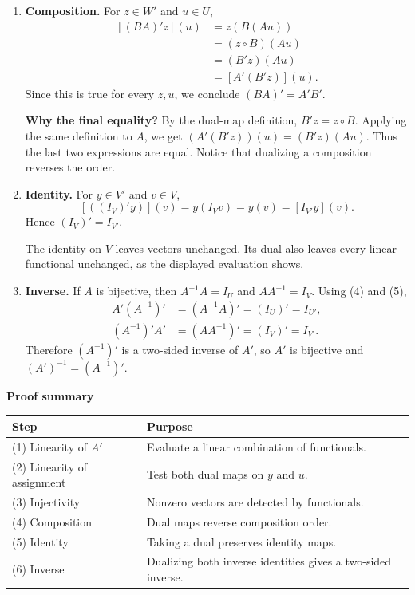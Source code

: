 \documentclass[11pt,a4paper]{article}
\newenvironment{proofsteps}{\begin{enumerate}\setlength{\itemsep}{4pt}}{\end{enumerate}}
\newcommand{\prooftable}[1]{\medskip\textbf{Proof summary}\par\smallskip #1\medskip}
\begin{document}
\begin{proofsteps}
\item \textbf{Composition.} For \(z\in W'\) and \(u\in U\),
\[
 \begin{aligned}
 [(BA)'z](u)
 &=z(B(Au))\\
 &=(z\circ B)(Au)\\
 &=(B'z)(Au)\\
 &=[A'(B'z)](u).
 \end{aligned}
\]
Since this is true for every \(z,u\), we conclude \((BA)'=A'B'\).
\begin{personalnote}
\textbf{Why the final equality?} By the dual-map definition, \(B'z=z\circ B\). Applying the same definition to \(A\), we get
\((A'(B'z))(u)=(B'z)(Au)\). Thus the last two expressions are equal. Notice that dualizing a composition reverses the order.
\end{personalnote}

\item \textbf{Identity.} For \(y\in V'\) and \(v\in V\),
\[
 [((I_V)'y)](v)=y(I_Vv)=y(v)=[I_{V'}y](v).
\]
Hence \((I_V)'=I_{V'}\).
\begin{personalnote}
The identity on \(V\) leaves vectors unchanged. Its dual also leaves every linear functional unchanged, as the displayed evaluation shows.
\end{personalnote}

\item \textbf{Inverse.} If \(A\) is bijective, then \(A^{-1}A=I_U\) and \(AA^{-1}=I_V\). Using (4) and (5),
\[
 \begin{aligned}
 A'(A^{-1})'&=(A^{-1}A)'=(I_U)'=I_{U'},\\
 (A^{-1})'A'&=(AA^{-1})'=(I_V)'=I_{V'}.
 \end{aligned}
\]
Therefore \((A^{-1})'\) is a two-sided inverse of \(A'\), so \(A'\) is bijective and \((A')^{-1}=(A^{-1})'\).
\end{proofsteps}
\prooftable{\begin{tabularx}{\linewidth}{@{}p{.23\linewidth}X@{}}\hline
Step & Purpose\\\hline
(1) Linearity of \(A'\) & Evaluate a linear combination of functionals.\\
(2) Linearity of assignment & Test both dual maps on \(y\) and \(u\).\\
(3) Injectivity & Nonzero vectors are detected by functionals.\\
(4) Composition & Dual maps reverse composition order.\\
(5) Identity & Taking a dual preserves identity maps.\\
(6) Inverse & Dualizing both inverse identities gives a two-sided inverse.\\\hline
\end{tabularx}}
\end{document}
